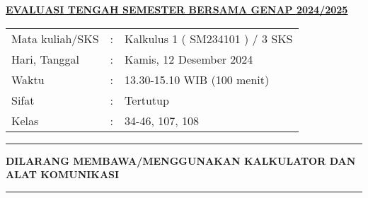 \documentclass[10pt,openany,a4paper]{article}
\begin{document}
    \begin{center}
	{\underline{\textbf{\MakeUppercase{Evaluasi Tengah Semester Bersama Genap 2024/2025}}}}
    \end{center}

    \begin{center}
	\begin{tabular}{lcl}
		Mata kuliah/SKS & : & Kalkulus 1 ( SM234101 ) / 3 SKS\\
		Hari, Tanggal & : & Kamis, 12 Desember 2024\\
		Waktu & : & 13.30-15.10 WIB (100 menit)\\
		Sifat & : & Tertutup\\
		Kelas & : & 34-46, 107, 108
	\end{tabular}
    \end{center}
	
    \noindent\rule{\textwidth}{2.pt}
	
    \setlength{\parindent}{5pt}
    \setlength{\parindent}{5pt}
    \setlength{\parindent}{5pt}
    \par \textbf{\MakeUppercase{dilarang membawa/menggunakan kalkulator dan alat komunikasi}}
    \par {}
    \noindent\rule{\textwidth}{2.pt}
    
\end{document}
